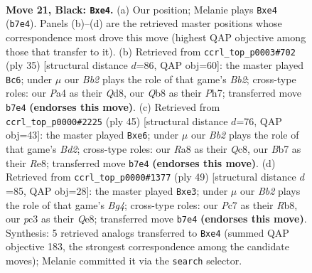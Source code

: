 \documentclass[11pt]{article}
\begin{document}
\clearpage

\begin{figure}[p]\centering
\begin{subfigure}{0.46\textwidth}\centering
\resizebox{\linewidth}{!}{%
\newchessgame
\chessboard[
  setfen={rq6/1bp2kpp/1b1p4/8/pP1NR1n1/2P5/P1Q2PPP/1RB2K2 b - - 0 21},
  showmover=false,
  pgfstyle=straightmove, color=movearrow, markmove={b7-e4}
]}
\caption{}
\end{subfigure}\hfill
\begin{subfigure}{0.46\textwidth}\centering
\resizebox{\linewidth}{!}{%
\newchessgame
\chessboard[
  setfen={r2q2k1/pb1p1p1p/1p1p2p1/3Nb3/8/2P3P1/PP3P1P/3RQBK1 b - - 0 18},
  showmover=false,
  pgfstyle=straightmove, color=movearrow, markmove={b7-c6}
]}
\caption{}
\end{subfigure}
\\[4pt]
\begin{subfigure}{0.46\textwidth}\centering
\resizebox{\linewidth}{!}{%
\newchessgame
\chessboard[
  setfen={2q1r1k1/1p1b2bp/p2pN1p1/3P4/2P5/1P1Q4/P2B2PP/5R1K b - - 0 23},
  showmover=false,
  pgfstyle=straightmove, color=movearrow, markmove={d7-e6}
]}
\caption{}
\end{subfigure}\hfill
\begin{subfigure}{0.46\textwidth}\centering
\resizebox{\linewidth}{!}{%
\newchessgame
\chessboard[
  setfen={1r2q2k/1b4pp/3p4/5rb1/pPB1p3/2R1N1P1/1P2QP1P/3R2K1 b - - 5 25},
  showmover=false,
  pgfstyle=straightmove, color=movearrow, markmove={g5-e3}
]}
\caption{}
\end{subfigure}
\caption{\textbf{Move 21, Black: \texttt{Bxe4}.} (a) Our position; Melanie plays \texttt{Bxe4} (\texttt{b7e4}). Panels (b)--(d) are the retrieved master positions whose correspondence most drove this move (highest QAP objective among those that transfer to it). (b) Retrieved from \texttt{ccrl\_top\_p0003\#702} (ply 35) [structural distance $d$=86, QAP obj=60]: the master played \texttt{Bc6}; under $\mu$ our \emph{Bb2} plays the role of that game's \emph{Bb2}; cross-type roles: our \emph{P}a4 as their \emph{Q}d8, our \emph{Q}b8 as their \emph{P}h7; transferred move \texttt{b7e4} \textbf{(endorses this move)}. (c) Retrieved from \texttt{ccrl\_top\_p0000\#2225} (ply 45) [structural distance $d$=76, QAP obj=43]: the master played \texttt{Bxe6}; under $\mu$ our \emph{Bb2} plays the role of that game's \emph{Bd2}; cross-type roles: our \emph{R}a8 as their \emph{Q}c8, our \emph{B}b7 as their \emph{R}e8; transferred move \texttt{b7e4} \textbf{(endorses this move)}. (d) Retrieved from \texttt{ccrl\_top\_p0000\#1377} (ply 49) [structural distance $d$=85, QAP obj=28]: the master played \texttt{Bxe3}; under $\mu$ our \emph{Bb2} plays the role of that game's \emph{Bg4}; cross-type roles: our \emph{P}c7 as their \emph{R}b8, our \emph{p}c3 as their \emph{Q}e8; transferred move \texttt{b7e4} \textbf{(endorses this move)}. Synthesis: 5 retrieved analogs transferred to \texttt{Bxe4} (summed QAP objective 183, the strongest correspondence among the candidate moves); Melanie committed it via the \texttt{search} selector.}
\label{fig:thought-m41}
\end{figure}
\end{document}
